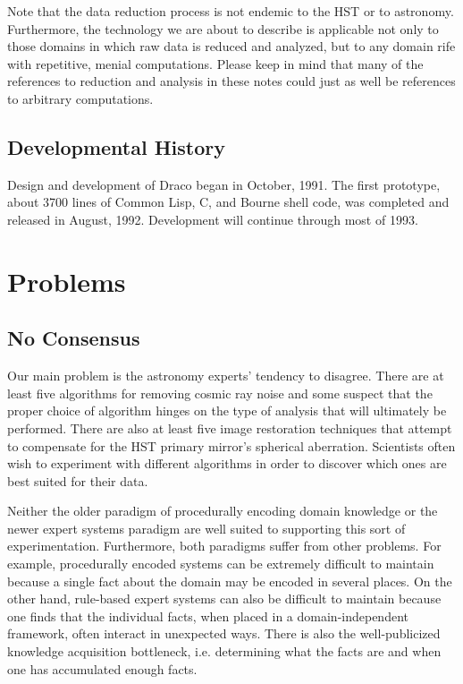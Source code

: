 Note that the data reduction process is not endemic to the HST or to astronomy.
Furthermore, the technology we are about to describe is applicable not only to
those domains in which raw data is reduced and analyzed, but to any domain
rife with repetitive, menial computations.  Please keep in mind that many of
the references to reduction and analysis in these notes could just as well be
references to arbitrary computations.

\subsection{Developmental History}

Design and development of Draco began in October, 1991.  The first prototype,
about 3700 lines of Common Lisp, C, and Bourne shell code, was completed and
released in August, 1992.  Development will continue through most of 1993.

\section{Problems}

\subsection{No Consensus}
Our main problem is the astronomy experts' tendency to disagree.  There are at
least five algorithms for removing cosmic ray noise and some suspect that the
proper choice of algorithm hinges on the type of analysis that will ultimately
be performed.  There are also at least five image restoration techniques that
attempt to compensate for the HST primary mirror's spherical aberration.
Scientists often wish to experiment with different algorithms in order to
discover which ones are best suited for their data.

Neither the older paradigm of procedurally encoding domain knowledge or the
newer expert systems paradigm are well suited to supporting this sort of
experimentation.  Furthermore, both paradigms suffer from other problems.
For example, procedurally encoded systems can be extremely difficult to
maintain because a single fact about the domain may be encoded in several
places.  On the other hand, rule-based expert systems can also be difficult
to maintain because one finds that the individual facts, when placed in a
domain-independent framework, often interact in unexpected ways.  There is
also the well-publicized knowledge acquisition bottleneck, i.e. determining
what the facts are and when one has accumulated enough facts.

